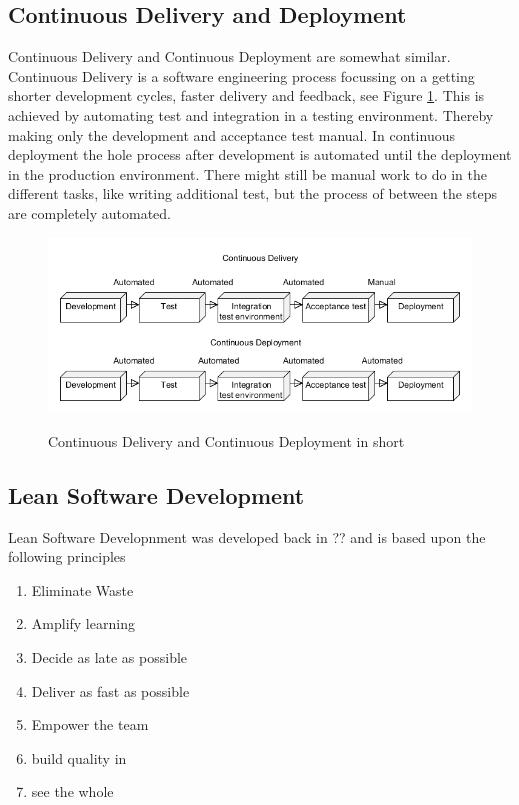 \documentclass{sig-alternate}
\begin{document}
\subsection{Continuous Delivery and Deployment}
Continuous Delivery and Continuous Deployment are somewhat similar.
Continuous Delivery is a software engineering process focussing on a getting shorter development cycles, faster delivery and feedback, see Figure \ref{fig:deliverydeploment}. This is achieved by automating test and integration in a testing environment. Thereby making only the development and acceptance test manual. In continuous deployment the hole process after development is automated until the deployment in the production environment. There might still be manual work to do in the different tasks, like writing additional test, but the process of between the steps are completely automated.  

\begin{figure}
\caption{Continuous Delivery and Continuous Deployment in short}
\includegraphics[scale=0.37]{Umlet/DeliveryandDeployment}
\label{fig:deliverydeploment}
\end{figure}


\subsection{Lean Software Development}
\label{lean}
Lean Software Developnment\cite{poppendieck:lean} was developed back in ?? and is based upon the following principles

\begin{enumerate}
\item Eliminate Waste
\item Amplify learning
\item Decide as late as possible
\item Deliver as fast as possible
\item Empower the team
\item build quality in
\item see the whole
\end{enumerate}
\end{document}
